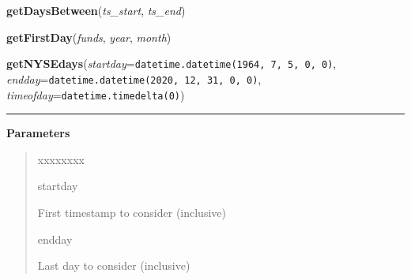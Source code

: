     \vspace{0.5ex}

\hspace{.8\funcindent}\begin{boxedminipage}{\funcwidth}

    \raggedright \textbf{getDaysBetween}(\textit{ts\_start}, \textit{ts\_end})

\setlength{\parskip}{2ex}
\setlength{\parskip}{1ex}
    \end{boxedminipage}

    \label{trunk:qstkutil:dateutil:getFirstDay}

    \vspace{0.5ex}

\hspace{.8\funcindent}\begin{boxedminipage}{\funcwidth}

    \raggedright \textbf{getFirstDay}(\textit{funds}, \textit{year}, \textit{month})

\setlength{\parskip}{2ex}
\setlength{\parskip}{1ex}
    \end{boxedminipage}

    \label{trunk:qstkutil:dateutil:getNYSEdays}

    \vspace{0.5ex}

\hspace{.8\funcindent}\begin{boxedminipage}{\funcwidth}

    \raggedright \textbf{getNYSEdays}(\textit{startday}={\tt datetime.datetime(1964, 7, 5, 0, 0)}, \textit{endday}={\tt datetime.datetime(2020, 12, 31, 0, 0)}, \textit{timeofday}={\tt datetime.timedelta(0)})

    \vspace{-1.5ex}

    \rule{\textwidth}{0.5\fboxrule}
\setlength{\parskip}{2ex}
\setlength{\parskip}{1ex}
      \textbf{Parameters}
      \vspace{-1ex}

      \begin{quote}
        \begin{Ventry}{xxxxxxxx}

          \item[startday]

          First timestamp to consider (inclusive)

          \item[endday]

          Last day to consider (inclusive)

        \end{Ventry}

      \end{quote}

    \end{boxedminipage}

